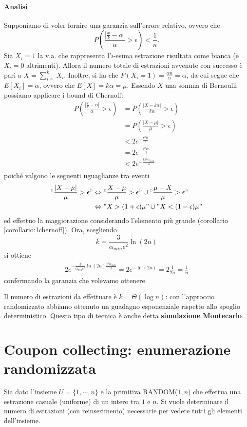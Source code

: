 \paragraph{Analisi}
Supponiamo di voler fornire una garanzia sull'errore relativo, ovvero che
\[
P\left(\frac{|\frac{x}{k}-\alpha|}{\alpha}>\epsilon\right)<\frac{1}{n}.
\]
Sia $X_i=1$ la v.a. che rappresenta l'$i$-esima estrazione risultata come bianca (e $X_i=0$ altrimenti). Allora il numero totale di estrazioni avvenute con successo è pari a $X=\sum_{i=}^{k}X_i$. Inoltre, si ha che $P(X_i=1)=\frac{\alpha n}{n}=\alpha$, da cui segue che $E[X_i]=\alpha$, ovvero che $E[X]=k\alpha=\mu$. Essendo $X$ una somma di Bernoulli possiamo applicare i bound di Chernoff:
\begin{align*}
P\left(\frac{|\frac{x}{k}-\alpha|}{\alpha}>\epsilon\right)&=P\left(\frac{|X-k\alpha|}{k\alpha}>\epsilon\right) \\
&=P\left(\frac{|X-\mu|}{\mu}>\epsilon\right) \\
&<2e^{-\frac{\epsilon^2\mu}{3}} \\
&=2e^{-\frac{\epsilon^2k\alpha}{3}} \\
&<2e^{-\frac{k\epsilon^2\alpha_{min}}{3}} \\
\end{align*}
poiché valgono le seguenti uguaglianze tra eventi
\begin{align*}
"\frac{|X-\mu|}{\mu}>\epsilon" &\Leftrightarrow "\frac{X-\mu}{\mu}>\epsilon" \cup "\frac{\mu -X}{\mu}>\epsilon" \\
&\Leftrightarrow "X>(1+\epsilon)\mu" \cup "X<(1-\epsilon)\mu"
\end{align*}
ed effettuo la maggiorazione considerando l'elemento più grande (corollario \ref{corollario:1chernoff}).
Ora, scegliendo
\[
k=\frac{3}{\alpha_{min}\epsilon^2}\ln{(2n)}
\]
si ottiene
\begin{align*}
2e^{-\frac{3}{\alpha_{min}\epsilon^2}\ln{(2n)}\frac{\epsilon^2\alpha_{min}}{3}} = 2e^{-\ln{(2n)}}=2\frac{1}{2n}=\frac{1}{n}
\end{align*}
confermando la garanzia che volevamo ottenere.

Il numero di estrazioni da effettuare è $k=\Theta(\log n)$: con l'approccio randomizzato abbiamo ottenuto un guadagno esponenziale rispetto allo spoglio deterministico. Questo tipo di tecnica è anche detta \textbf{simulazione Montecarlo}.

\section{Coupon collecting: enumerazione randomizzata}
Sia dato l'insieme $U=\{1,\cdots,n\}$ e la primitiva RANDOM($1,n$) che effettua una estrazione casuale (uniforme) di un intero tra $1$ e $n$. Si vuole determinare il numero di estrazioni (con reinserimento) necessarie per vedere tutti gli elementi dell'insieme.

